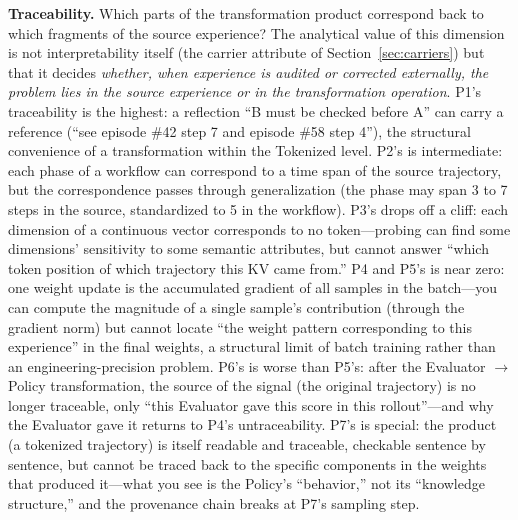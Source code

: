 \textbf{Traceability.} Which parts of the transformation product correspond back to which fragments of the source experience? The analytical value of this dimension is not interpretability itself (the carrier attribute of Section~\ref{sec:carriers}) but that it decides \emph{whether, when experience is audited or corrected externally, the problem lies in the source experience or in the transformation operation}. P1's traceability is the highest: a reflection ``B must be checked before A'' can carry a reference (``see episode \#42 step 7 and episode \#58 step 4''), the structural convenience of a transformation within the Tokenized level. P2's is intermediate: each phase of a workflow can correspond to a time span of the source trajectory, but the correspondence passes through generalization (the phase may span 3 to 7 steps in the source, standardized to 5 in the workflow). P3's drops off a cliff: each dimension of a continuous vector corresponds to no token---probing can find some dimensions' sensitivity to some semantic attributes, but cannot answer ``which token position of which trajectory this KV came from.'' P4 and P5's is near zero: one weight update is the accumulated gradient of all samples in the batch---you can compute the magnitude of a single sample's contribution (through the gradient norm) but cannot locate ``the weight pattern corresponding to this experience'' in the final weights, a structural limit of batch training rather than an engineering-precision problem. P6's is worse than P5's: after the Evaluator $\rightarrow$ Policy transformation, the source of the signal (the original trajectory) is no longer traceable, only ``this Evaluator gave this score in this rollout''---and why the Evaluator gave it returns to P4's untraceability. P7's is special: the product (a tokenized trajectory) is itself readable and traceable, checkable sentence by sentence, but cannot be traced back to the specific components in the weights that produced it---what you see is the Policy's ``behavior,'' not its ``knowledge structure,'' and the provenance chain breaks at P7's sampling step.

